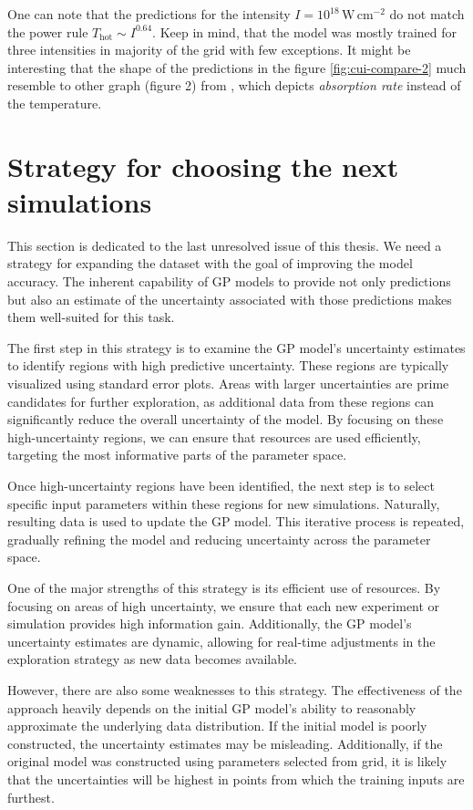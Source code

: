 One can note that the predictions for the intensity $I = 10^{18} \, \mathrm{W} \, \mathrm{cm}^{-2}$ do not match the power rule $T_\mathrm{hot} \sim I^{0.64}$. Keep in mind, that the model was mostly trained for three intensities in majority of the grid with few exceptions. It might be interesting that the shape of the predictions in the figure \ref{fig:cui-compare-2} much resemble to other graph (figure 2) from \cite{cui2013}, which depicts \textit{absorption rate} instead of the temperature. 

\section{Strategy for choosing the next simulations}

This section is dedicated to the last unresolved issue of this thesis. We need a strategy for expanding the dataset with the goal of improving the model accuracy. The inherent capability of GP models to provide not only predictions but also an estimate of the uncertainty associated with those predictions makes them well-suited for this task.

The first step in this strategy is to examine the GP model's uncertainty estimates to identify regions with high predictive uncertainty. These regions are typically visualized using standard error plots. Areas with larger uncertainties are prime candidates for further exploration, as additional data from these regions can significantly reduce the overall uncertainty of the model. By focusing on these high-uncertainty regions, we can ensure that resources are used efficiently, targeting the most informative parts of the parameter space.

Once high-uncertainty regions have been identified, the next step is to select specific input parameters within these regions for new simulations. Naturally, resulting data is used to update the GP model. This iterative process is repeated, gradually refining the model and reducing uncertainty across the parameter space.

One of the major strengths of this strategy is its efficient use of resources. By focusing on areas of high uncertainty, we ensure that each new experiment or simulation provides high information gain. Additionally, the GP model's uncertainty estimates are dynamic, allowing for real-time adjustments in the exploration strategy as new data becomes available. 

However, there are also some weaknesses to this strategy. The effectiveness of the approach heavily depends on the initial GP model's ability to reasonably approximate the underlying data distribution. If the initial model is poorly constructed, the uncertainty estimates may be misleading. Additionally, if the original model was constructed using parameters selected from grid, it is likely that the uncertainties will be highest in points from which the training inputs are furthest.

